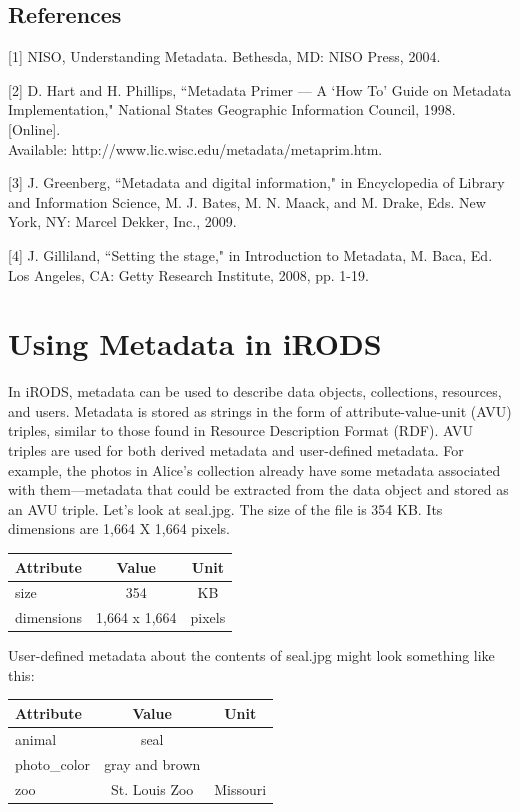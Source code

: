 \documentclass[10pt,oneside]{memoir}
\begin{document}
\subsection{References}

[1] NISO, Understanding Metadata. Bethesda, MD: NISO Press, 2004.

[2] D. Hart and H. Phillips, ``Metadata Primer --- A `How To' Guide on Metadata Implementation," National States Geographic Information Council, 1998. [Online]. \\
Available: http://www.lic.wisc.edu/metadata/metaprim.htm.

[3] J. Greenberg, ``Metadata and digital information," in Encyclopedia of Library and Information Science, M. J. Bates, M. N. Maack, and M. Drake, Eds. New York, NY: Marcel Dekker, Inc., 2009.

[4] J. Gilliland, ``Setting the stage," in Introduction to Metadata, M. Baca, Ed. Los Angeles, CA: Getty Research Institute, 2008, pp. 1-19.

\section{Using Metadata in iRODS}

In iRODS, metadata can be used to describe data objects, collections, resources, and users. Metadata is stored as strings in the form of attribute-value-unit (AVU) triples, similar to those found in Resource Description Format (RDF). AVU triples are used for both derived metadata and user-defined metadata. For example, the photos in Alice's collection already have some metadata associated with them---metadata that could be extracted from the data object and stored as an AVU triple. Let's look at seal.jpg. The size of the file is 354 KB. Its dimensions are 1,664 X 1,664 pixels.

\begin{center}
\begin{tabular}{ |l|c|c| }
 \hline
Attribute & Value & Unit \\
\hline
size & 354 & KB \\
dimensions & 1,664 x 1,664 & pixels \\
 \hline
\end{tabular}
\end{center}

User-defined metadata about the contents of seal.jpg might look something like this:

\begin{center}
\begin{tabular}{ |l|c|c| }
 \hline
Attribute & Value & Unit \\
\hline
animal & seal & \\
photo\_color & gray and brown & \\
zoo & St. Louis Zoo & Missouri \\
 \hline
\end{tabular}
\end{center}
\end{document}
